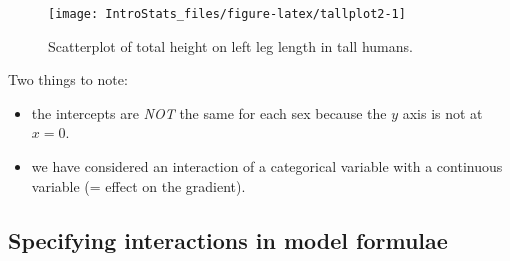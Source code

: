 \documentclass[
  oneside]{krantz}
\newenvironment{Shaded}{\begin{snugshade}}{\end{snugshade}}
\newcommand{\AttributeTok}[1]{\textcolor[rgb]{0.77,0.63,0.00}{#1}}
\newcommand{\CommentTok}[1]{\textcolor[rgb]{0.56,0.35,0.01}{\textit{#1}}}
\newcommand{\DecValTok}[1]{\textcolor[rgb]{0.00,0.00,0.81}{#1}}
\newcommand{\FloatTok}[1]{\textcolor[rgb]{0.00,0.00,0.81}{#1}}
\newcommand{\FunctionTok}[1]{\textcolor[rgb]{0.00,0.00,0.00}{#1}}
\newcommand{\NormalTok}[1]{#1}
\newcommand{\SpecialCharTok}[1]{\textcolor[rgb]{0.00,0.00,0.00}{#1}}
\newcommand{\StringTok}[1]{\textcolor[rgb]{0.31,0.60,0.02}{#1}}
\begin{document}
\begin{Shaded}
\end{Shaded}

\begin{figure}

{\centering \texttt{[image: IntroStats\_files/figure-latex/tallplot2-1]} 

}

\caption{Scatterplot of total height on left leg length in tall humans.}\label{fig:tallplot2}
\end{figure}

Two things to note:

\begin{itemize}
\item
  the intercepts are \emph{NOT} the same for each sex because the \(y\) axis is not at \(x = 0\).
\item
  we have considered an interaction of a categorical variable with a continuous variable (= effect on the gradient).
\end{itemize}

\hypertarget{specifying-interactions-in-model-formulae}{%
\subsection{Specifying interactions in model formulae}\label{specifying-interactions-in-model-formulae}}
\end{document}
